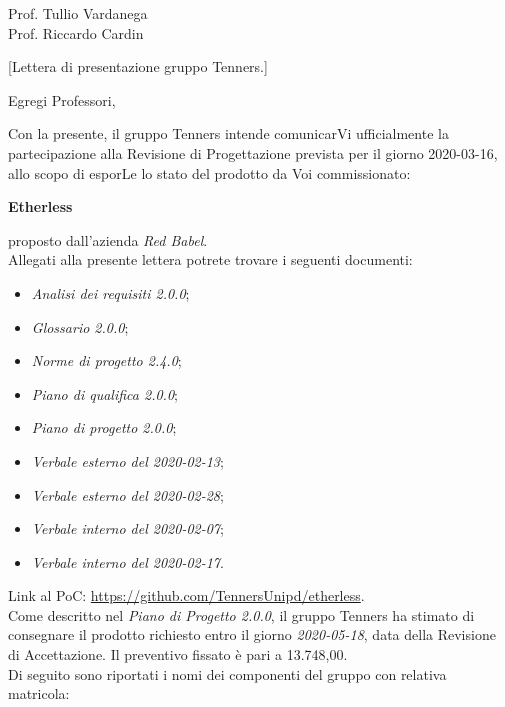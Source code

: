 \begin{letter}{\begin{flushright}
			Prof. Tullio Vardanega \\
			Prof. Riccardo Cardin 
	\end{flushright}}[Lettera di presentazione gruppo Tenners.]
\opening[Padova, ]{Egregi Professori,}
	\noindent Con la presente, il gruppo Tenners intende comunicarVi ufficialmente la partecipazione alla Revisione di Progettazione prevista per il giorno 2020-03-16, allo scopo di esporLe lo stato del prodotto da Voi commissionato:
	\begin{center}
		\textbf{Etherless}
	\end{center}
    proposto dall'azienda \textit{Red Babel}. \\
    \noindent Allegati alla presente lettera potrete trovare i seguenti documenti:
    \begin{itemize}
    	\item \textit{Analisi dei requisiti 2.0.0\docs};
    	\item \textit{Glossario 2.0.0\docs};
    	\item \textit{Norme di progetto 2.4.0\docs};
    	\item \textit{Piano di qualifica 2.0.0\docs};
    	\item \textit{Piano di progetto 2.0.0\docs};
    	\item \textit{Verbale esterno del 2020-02-13\docs};
    	\item \textit{Verbale esterno del 2020-02-28\docs};
    	\item \textit{Verbale interno del 2020-02-07\docs};
    	\item \textit{Verbale interno del 2020-02-17\docs}.
    \end{itemize}
	Link al PoC: \url{https://github.com/TennersUnipd/etherless}.\\
    \noindent Come descritto nel \textit{Piano di Progetto 2.0.0}\docs, il gruppo Tenners ha stimato di consegnare il prodotto richiesto entro il giorno \textit{2020-05-18}, data della Revisione di Accettazione. Il preventivo fissato è pari a 13.748,00\officialeuro.\\ 
    \noindent Di seguito sono riportati i nomi dei componenti del gruppo con relativa matricola:
    \begin{center}
    	\renewcommand{\arraystretch}{1.8}
    	

\end{center}
\end{letter}
